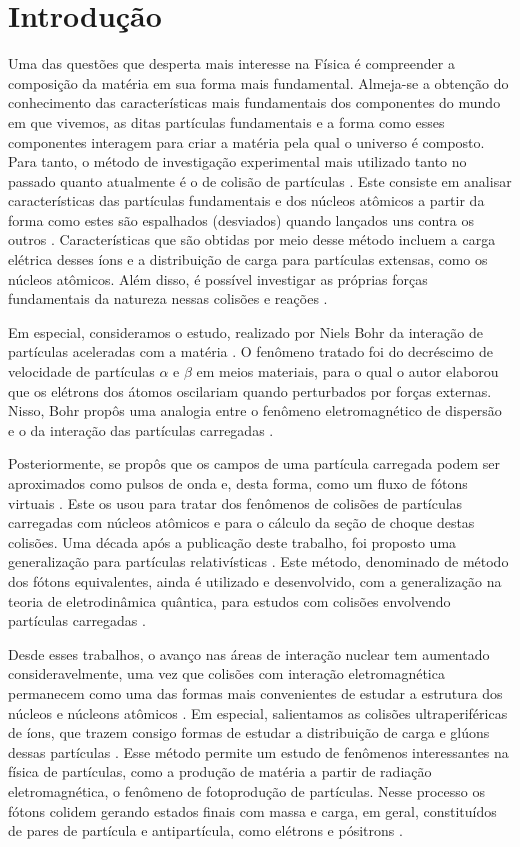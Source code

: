 \chapter{Introdução}

Uma das questões que desperta mais interesse na Física é compreender a
composição da matéria em sua forma mais fundamental.  Almeja-se a obtenção do
conhecimento das características mais fundamentais dos componentes do mundo em
que vivemos, as ditas partículas fundamentais e a forma como esses componentes
interagem para criar a matéria pela qual o universo é composto. Para tanto, o
método de investigação experimental mais utilizado tanto no passado quanto
atualmente é o de colisão de partículas \cite{griffiths_particle}. Este
consiste em analisar características das partículas fundamentais e dos núcleos
atômicos a partir da forma como estes são espalhados (desviados) quando
lançados uns contra os outros \cite{thomson_particle}.  Características que são
obtidas por meio desse método incluem a carga elétrica desses íons e a
distribuição de carga para partículas extensas, como os núcleos atômicos. Além
disso, é possível investigar as próprias forças fundamentais da natureza nessas
colisões e reações \cite{griffiths_particle}.

Em especial, consideramos o estudo, realizado por Niels Bohr da interação de
partículas aceleradas com a matéria \cite{bohr1913}. O
fenômeno tratado foi do decréscimo de velocidade de partículas $\alpha$ e
$\beta$ em meios materiais, para o qual o autor elaborou que os elétrons dos
átomos oscilariam quando perturbados por forças externas. Nisso,
Bohr propôs uma analogia entre o fenômeno
eletromagnético de dispersão e o da interação das partículas carregadas .

Posteriormente, se propôs que os campos de uma partícula carregada
podem ser aproximados como pulsos de onda e, desta forma, como um fluxo de
fótons virtuais \cite{Fermi1924}. Este os usou para tratar dos fenômenos de colisões de
partículas carregadas com núcleos atômicos e para o cálculo da seção de choque
destas colisões. Uma década após a publicação deste trabalho,
foi proposto uma generalização para partículas relativísticas \cite{williams1933}. Este método,
denominado de método
dos fótons equivalentes, ainda é utilizado e desenvolvido, com a generalização
na teoria de eletrodinâmica quântica, para estudos com colisões envolvendo
partículas carregadas \cite{BALTZ20081}.

Desde esses trabalhos, o avanço nas áreas de interação nuclear tem aumentado
consideravelmente, uma vez que colisões com interação eletromagnética
permanecem como uma das formas mais convenientes de estudar a estrutura dos
núcleos e núcleons atômicos \cite{harland-lang2023}. Em especial, salientamos
as colisões ultraperiféricas de íons, que trazem consigo formas de estudar a
distribuição de carga e glúons dessas partículas \cite{bertulani2005}. Esse
método permite um estudo de fenômenos interessantes na física de partículas,
como a produção de matéria a partir de radiação eletromagnética, o fenômeno de
fotoprodução de partículas. Nesse processo os fótons colidem gerando estados
finais com massa e carga, em geral, constituídos de pares de partícula e
antipartícula, como elétrons e pósitrons \cite{Gerhard_Baur_1998}.

